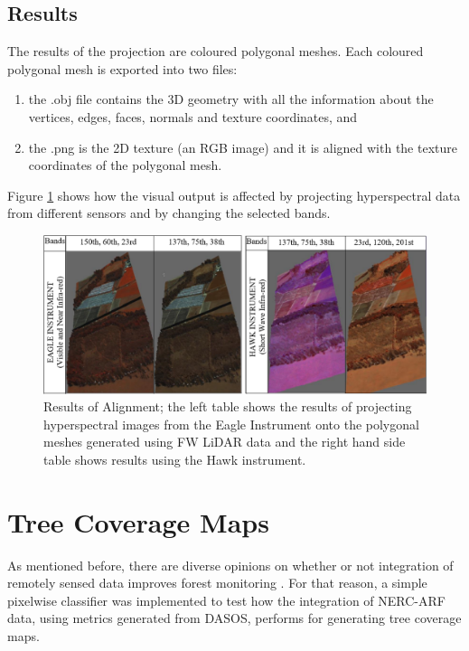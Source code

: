 \documentclass{subfiles}
\begin{document}
	\subsection {Results}
	

		\par The results of the projection are coloured polygonal meshes. Each coloured polygonal mesh is exported into two files:
		\begin{enumerate}
			\item the .obj file contains the 3D geometry with all the information about the vertices, edges, faces, normals and texture coordinates, and
			\item the .png is the 2D texture (an RGB image) and it is aligned with the texture coordinates of the polygonal mesh.
		\end{enumerate} 
		
		 \par Figure \ref{fig:AlignementResults} shows how the visual output is affected by projecting hyperspectral data from different sensors and by changing the selected bands. 
		
			
		
		\begin{figure} [h!]
		  	\centering
		  	\includegraphics[width=\textwidth]{img/AlignmentEagle_Hawk}
		  	\caption[Results of Alignement]{Results of Alignment; the left table shows the results of projecting hyperspectral images from the Eagle Instrument onto the polygonal meshes generated using FW LiDAR data and the right hand side table shows results using the Hawk instrument.}
		  	\label{fig:AlignementResults}
		\end{figure}
		
	\newpage	
\section{Tree Coverage Maps}

\par As mentioned before, there are diverse opinions on whether or not integration of remotely sensed data improves forest monitoring \cite{Clark2011} \cite{Anderson2008}. For that reason, a simple pixelwise classifier was implemented to test how the integration of NERC-ARF data, using metrics generated from DASOS, performs for generating tree coverage maps.  
\end{document}
